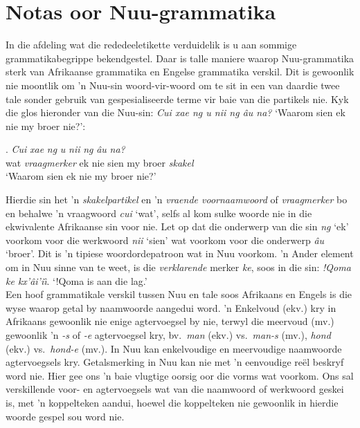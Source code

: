 \markboth{}{}
\section{Notas oor N\textipa{\textvertline}uu-grammatika}
\markboth{}{}

In die afdeling wat die rededeeletikette verduidelik is u aan sommige
grammatikabegrippe bekendgestel. Daar is talle maniere waarop
N\textipa{\textvertline}uu-grammatika sterk van Afrikaanse grammatika
en Engelse grammatika verskil. Dit is gewoonlik nie moontlik om 'n
N\textipa{\textvertline}uu-sin woord-vir-woord om te sit in een van
daardie twee tale sonder gebruik van gespesialiseerde terme vir baie
van die partikels nie. Kyk die glos hieronder van die
N\textipa{\textvertline}uu-sin: \emph{Cui xae ng
\textipa{\textdoublevertline}u n\textipa{\textvertline}ii ng
\textipa{\textdoublevertline}\^{a}u n\textipa{\textdoublevertline}a?}
`Waarom sien ek nie my broer nie?':

\exg.
\emph{Cui} \emph{xae} \emph{ng} \emph{\textipa{\textdoublevertline}u}
\emph{n\textipa{\textvertline}ii} \emph{ng}
\emph{\textipa{\textdoublevertline}\^{a}u}
\emph{n\textipa{\textdoublevertline}a?}\\
wat \emph{vraagmerker} ek nie sien my broer \emph{skakel}\\
`Waarom sien ek nie my broer nie?' \parencite[66, voorbeeld 31]{Collins2011}

Hierdie sin het 'n \emph{skakelpartikel} en 'n \emph{vraende
voornaamwoord} of \emph{vraagmerker} bo en behalwe 'n vraagwoord
\emph{cui} `wat', selfs al kom sulke woorde nie in die ekwivalente
Afrikaanse sin voor nie. Let op dat die onderwerp van die sin
\emph{ng} `ek' voorkom voor die werkwoord
\emph{n\textipa{\textvertline}ii} `sien' wat voorkom voor die
onderwerp \emph{\textipa{\textdoublevertline}\^{a}u} `broer'. Dit is
'n tipiese woordordepatroon wat in N\textipa{\textvertline}uu voorkom.
'n Ander element om in N\textipa{\textvertline}uu sinne van te weet,
is die \emph{verklarende} merker \emph{ke}, soos in die sin:
\emph{!Qoma ke kx'\^{a}i'i\^{\i}}.  `!Qoma is aan die lag.'\\

Een hoof grammatikale verskil tussen N\textipa{\textvertline}uu en
tale soos Afrikaans en Engels is die wyse waarop getal by naamwoorde
aangedui word. 'n Enkelvoud (ekv.) kry in Afrikaans gewoonlik nie
enige agtervoegsel by nie, terwyl die meervoud (mv.) gewoonlik 'n
\emph{-s} of \emph{-e} agtervoegsel kry, bv.\ \emph{man} (ekv.) vs.\
\emph{man-s} (mv.), \emph{hond} (ekv.) vs.\ \emph{hond-e} (mv.). In
N\textipa{\textvertline}uu kan enkelvoudige en meervoudige naamwoorde
agtervoegsels kry. Getalsmerking in N\textipa{\textvertline}uu kan nie
met 'n eenvoudige re\"{e}l beskryf word nie. Hier gee ons 'n baie
vlugtige oorsig oor die vorms wat voorkom. Ons sal verskillende voor-
en agtervoegsels wat van die naamwoord of werkwoord geskei is, met 'n
koppelteken aandui, hoewel die koppelteken nie gewoonlik in hierdie
woorde gespel sou word nie.\\


